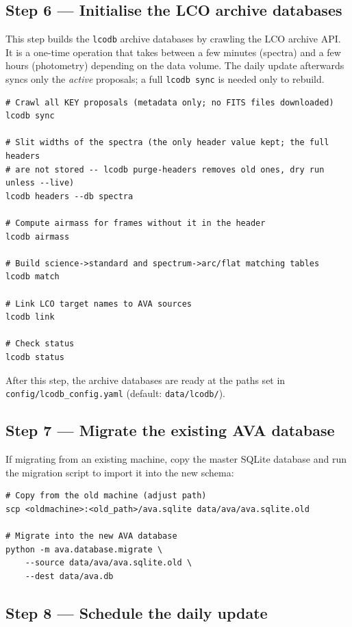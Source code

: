 \documentclass[12pt,a4paper]{article}
\begin{document}
\subsection{Step 6 --- Initialise the LCO archive databases}

This step builds the \texttt{lcodb} archive databases by crawling the LCO
archive API.  It is a one-time operation that takes between a few minutes
(spectra) and a few hours (photometry) depending on the data volume.  The daily update
afterwards syncs only the \emph{active} proposals; a full \texttt{lcodb sync} is needed only to rebuild.

\begin{lstlisting}[style=shell]
# Crawl all KEY proposals (metadata only; no FITS files downloaded)
lcodb sync

# Slit widths of the spectra (the only header value kept; the full headers
# are not stored -- lcodb purge-headers removes old ones, dry run unless --live)
lcodb headers --db spectra

# Compute airmass for frames without it in the header
lcodb airmass

# Build science->standard and spectrum->arc/flat matching tables
lcodb match

# Link LCO target names to AVA sources
lcodb link

# Check status
lcodb status
\end{lstlisting}

After this step, the archive databases are ready at the paths set in
\texttt{config/lcodb\_config.yaml} (default: \texttt{data/lcodb/}).

\subsection{Step 7 --- Migrate the existing AVA database}

If migrating from an existing machine, copy the master SQLite database and
run the migration script to import it into the new schema:

\begin{lstlisting}[style=shell]
# Copy from the old machine (adjust path)
scp <oldmachine>:<old_path>/ava.sqlite data/ava/ava.sqlite.old

# Migrate into the new AVA database
python -m ava.database.migrate \
    --source data/ava/ava.sqlite.old \
    --dest data/ava.db
\end{lstlisting}

\subsection{Step 8 --- Schedule the daily update}
\end{document}
